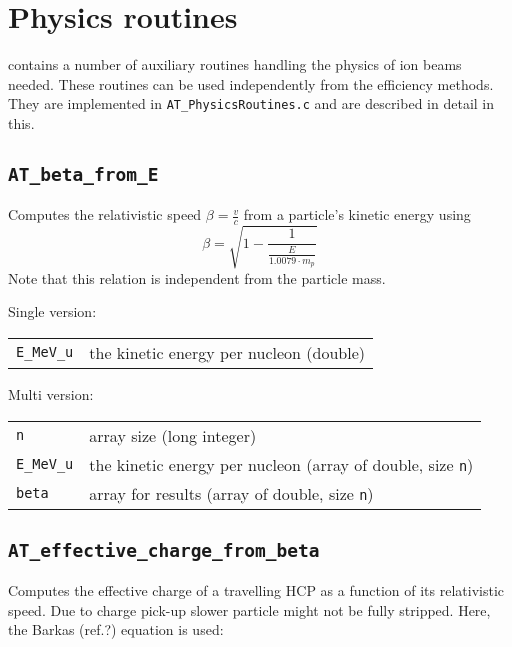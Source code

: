 
\chapter{Physics routines}

\la{} contains a number of auxiliary routines handling the physics of ion beams needed. These routines can be used independently from the efficiency methods. They are implemented in \texttt{AT\_PhysicsRoutines.c} and are described in detail in this.

\section{\texttt{AT\_beta\_from\_E}}

Computes the relativistic speed $\beta=\frac{v}{c}$ from a particle's kinetic energy using
\begin{equation}
\beta = \sqrt{1 - \frac{1}{\frac{E}{1.0079\cdot m_p}}}
\end{equation}
Note that this relation is independent from the particle mass. 

Single version:\\

\begin{tabular}{l l}
\texttt{E\_MeV\_u} & the kinetic energy per nucleon (double) \\
\end{tabular}

Multi version:\\

\begin{tabular}{l l}
\texttt{n} & array size (long integer) \\
\texttt{E\_MeV\_u} & the kinetic energy per nucleon (array of double, size \texttt{n}) \\
\texttt{beta} & array for results (array of double, size \texttt{n}) \\
\end{tabular}


\section{\texttt{AT\_effective\_charge\_from\_beta}}

Computes the effective charge of a travelling HCP as a function of its relativistic speed. Due to charge pick-up slower particle might not be fully stripped. Here, the Barkas (ref.?) equation is used:

